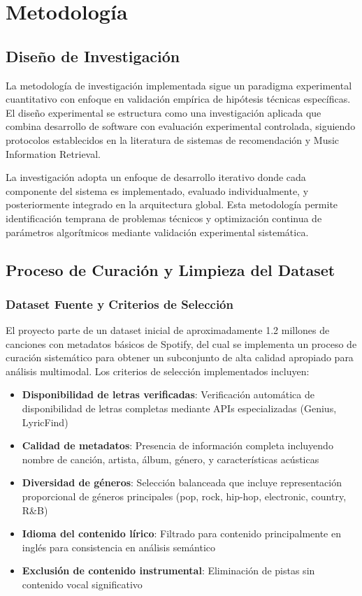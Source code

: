 \documentclass[12pt,a4paper]{article}
\begin{document}
\section{Metodología}

\subsection{Diseño de Investigación}

La metodología de investigación implementada sigue un paradigma experimental cuantitativo con enfoque en validación empírica de hipótesis técnicas específicas. El diseño experimental se estructura como una investigación aplicada que combina desarrollo de software con evaluación experimental controlada, siguiendo protocolos establecidos en la literatura de sistemas de recomendación y Music Information Retrieval.

La investigación adopta un enfoque de desarrollo iterativo donde cada componente del sistema es implementado, evaluado individualmente, y posteriormente integrado en la arquitectura global. Esta metodología permite identificación temprana de problemas técnicos y optimización continua de parámetros algorítmicos mediante validación experimental sistemática.

\subsection{Proceso de Curación y Limpieza del Dataset}

\subsubsection{Dataset Fuente y Criterios de Selección}

El proyecto parte de un dataset inicial de aproximadamente 1.2 millones de canciones con metadatos básicos de Spotify, del cual se implementa un proceso de curación sistemático para obtener un subconjunto de alta calidad apropiado para análisis multimodal. Los criterios de selección implementados incluyen:

\begin{itemize}
    \item \textbf{Disponibilidad de letras verificadas}: Verificación automática de disponibilidad de letras completas mediante APIs especializadas (Genius, LyricFind)
    \item \textbf{Calidad de metadatos}: Presencia de información completa incluyendo nombre de canción, artista, álbum, género, y características acústicas
    \item \textbf{Diversidad de géneros}: Selección balanceada que incluye representación proporcional de géneros principales (pop, rock, hip-hop, electronic, country, R\&B)
    \item \textbf{Idioma del contenido lírico}: Filtrado para contenido principalmente en inglés para consistencia en análisis semántico
    \item \textbf{Exclusión de contenido instrumental}: Eliminación de pistas sin contenido vocal significativo
\end{itemize}
\end{document}
